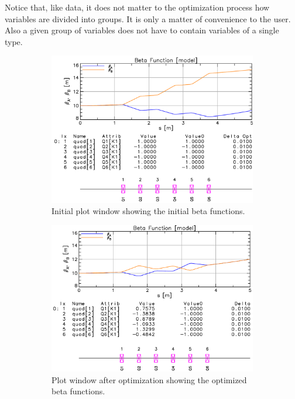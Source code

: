 \documentclass{hitec}
\begin{document}
{\begin{code}
\begin{code}
Notice that, like data, it does not matter to the optimization process how variables are divided
into  groups. It is only a matter of convenience to the user. Also a given 
group of variables does not have to contain variables of a single type.

\begin{figure}[tb]
  \centering
  \begin{subfigure}[b]{0.48\textwidth}
    \includegraphics[width=\textwidth]{opt0.pdf}
    \caption{Initial plot window showing the initial beta functions.}
    \label{f:opt0}
  \end{subfigure}
  \hfil
  \begin{subfigure}[b]{0.48\textwidth}
    \includegraphics[width=\textwidth]{opt1.pdf}
    \caption{Plot window after optimization showing the optimized beta functions.}
    \label{f:opt1}
  \end{subfigure}
  \caption{}
\end{figure}


\end{code}
\end{code}}
\end{document}
